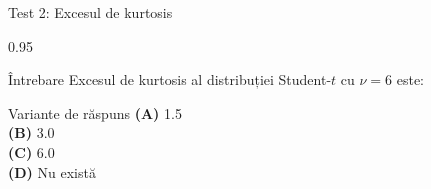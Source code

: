 \documentclass[9pt, aspectratio=169, t]{beamer}
\begin{document}
\begin{frame}{Test 2: Excesul de kurtosis}
\begin{cminipage}{0.95\textwidth}
    \begin{alertblock}{Întrebare}
        Excesul de kurtosis al distribuției Student-$t$ cu $\nu = 6$ este:
    \end{alertblock}

    \vspace{0.5cm}
    \begin{block}{Variante de răspuns}
    \textcolor{MainBlue}{\textbf{(A)}} 1.5\\[3pt]
    \textcolor{MainBlue}{\textbf{(B)}} 3.0\\[3pt]
    \textcolor{MainBlue}{\textbf{(C)}} 6.0\\[3pt]
    \textcolor{MainBlue}{\textbf{(D)}} Nu există
    \end{block}
\end{cminipage}
\end{frame}
\end{document}
